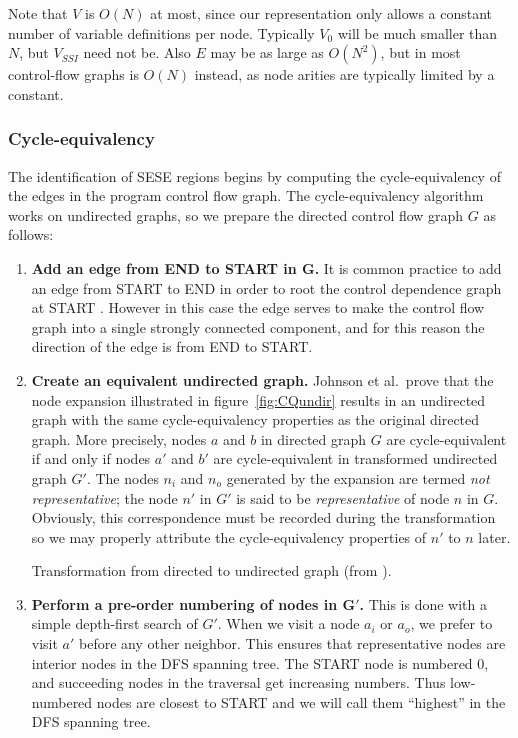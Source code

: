 \documentclass[12pt,titlepage,twoside]{article}
\newcommand*{\figscale}{1.0}
\begin{document}
Note that $V$ is $O(N)$ at most, since our representation only allows
a constant number of variable definitions per node.  Typically $V_0$
will be much smaller than $N$, but $V_{SSI}$ need not be.  Also $E$
may be as large as $O(N^2)$, but in most control-flow graphs is $O(N)$
instead, as node arities are typically limited by a constant.

\subsubsection{Cycle-equivalency}
\newcommand{\cyceq}{\equiv_{cq}}%
The identification of SESE regions begins by computing the
cycle-equivalency of the edges in the program control flow graph.  The
cycle-equivalency algorithm works on undirected graphs, so we prepare the
directed control flow graph $G$ as follows:
\begin{enumerate}
\item \textbf{Add an edge from END to START in $\mathbf{G}$.} It is common
practice to add an edge from START to END in order to root the control
dependence graph at START \cite{cytron89:ssa}.  However in this case
the edge serves to make the control flow graph into a single strongly
connected component, and for this reason the direction of the edge is
from END to START.
\item \textbf{Create an equivalent undirected graph.}  Johnson et al.\
prove that the node expansion illustrated in figure~\vref{fig:CQundir}
results in an undirected graph with the same cycle-equivalency
properties as the original directed graph.  More precisely, nodes $a$
and $b$ in directed graph $G$ are cycle-equivalent if and only if
nodes $a'$ and $b'$ are cycle-equivalent in transformed undirected
graph $G'$.  The nodes $n_i$ and $n_o$ generated by the expansion are
termed \emph{not representative}; the node $n'$ in $G'$ is said to be
\emph{representative} of node $n$ in $G$.  Obviously, this
correspondence must be recorded during the transformation so we may
properly attribute the cycle-equivalency properties of $n'$ to $n$
later.
\begin{myfigure}
\begin{center}
\renewcommand*{\figscale}{0.5}
\end{center}
\caption{Transformation from directed to undirected graph
	 (from \cite{johnson93:sese}).}
\label{fig:CQundir}
\end{myfigure}
\item \textbf{Perform a pre-order numbering of nodes in $\mathbf{G'}$.}
This is done with a simple depth-first search of $G'$.  When we visit
a node $a_i$ or $a_o$, we prefer to visit $a'$ before any other
neighbor.  This ensures that representative nodes are interior nodes
in the DFS spanning tree. The START node is numbered 0, and succeeding
nodes in the traversal get increasing numbers.  Thus low-numbered
nodes are closest to START and we will call them ``highest'' in the
DFS spanning tree.
\end{enumerate}
\end{document}
